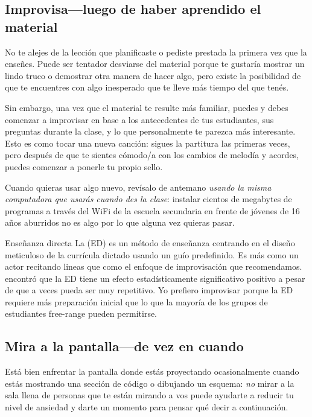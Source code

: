 \subsection*{Improvisa---luego de haber aprendido el material}

No te alejes de la lección que planificaste o pediste prestada la primera vez que la enseñes.
Puede ser tentador desviarse del material
porque te gustaría mostrar un lindo truco o demostrar otra manera de hacer algo,
pero existe la posibilidad de que te encuentres con algo inesperado 
que te lleve más tiempo del que tenés.

Sin embargo, una vez que el material te resulte más familiar,
puedes y debes comenzar a improvisar en base a los antecedentes de tus estudiantes,
sus preguntas durante la clase,
y lo que personalmente te parezca más interesante.
Esto es como tocar una nueva canción:
sigues la partitura las primeras veces,
pero después de que te sientes cómodo/a con los cambios de melodía y acordes,
puedes comenzar a ponerle tu propio sello.

Cuando quieras usar algo nuevo,
revísalo de antemano
\emph{usando la misma computadora que usarás cuando des la clase}:
instalar cientos de megabytes de programas a través del WiFi de la escuela secundaria
en frente de jóvenes de 16 años aburridos no es algo por lo que alguna vez quieras pasar.

\begin{aside}{Enseñanza directa}
  La  (ED) es un método de enseñanza
  centrando en el diseño meticuloso de la currícula dictado usando un guío predefinido.
  Es más como un actor recitando lineas que como el enfoque de improvisación que recomendamos.
  \cite{Stoc2018} encontró que la ED tiene un efecto estadísticamente significativo positivo 
  a pesar de que a veces pueda ser muy repetitivo.
  Yo prefiero improvisar porque la ED requiere más preparación inicial que lo que la mayoría 
  de los grupos de estudiantes free-range pueden permitirse.
\end{aside}

\subsection*{Mira a la pantalla---de vez en cuando}

Está bien enfrentar la pantalla donde estás proyectando ocasionalmente
cuando estás mostrando una sección de código o dibujando un esquema:
\emph{no} mirar a la sala llena de personas que te están mirando a vos
puede ayudarte a reducir tu nivel de ansiedad y darte un momento para pensar qué decir a continuación.

